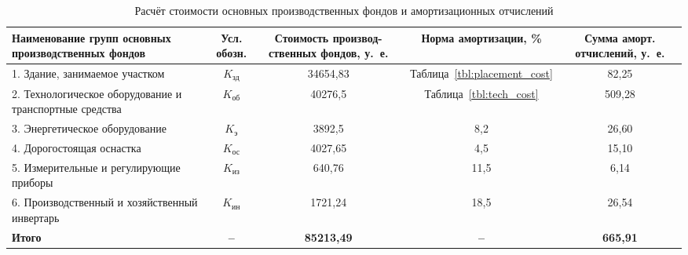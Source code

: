 \begin{table} [h!]
  \caption{
    Расчёт стоимости основных производственных фондов и
    амортизационных отчислений
  }\label{tbl:common_cost}
  {\small
    \begin{tabular}{| m{6.3cm} | c | c | c | c |}
      \hline
        \parbox{6.3cm}{
          \smallskip
          \centering Наименование групп основных производственных фондов
          \smallskip
        }
      & \parbox{1cm}{
          \smallskip
          \centering Усл. \\ обозн.
        }
      & \parbox{2.3cm}{
        \smallskip
          \centering Стоимость производ- ственных фондов, у.~е.
        }
      & \parbox{2.3cm}{
          \centering Норма амортизации, \%
        }
      & \parbox{2.4cm}{
          \centering Сумма аморт. отчислений, у.~е.
        } \\
      \hline

      1. Здание, занимаемое участком 
      & \( K_{\text{зд}} \) 
      & 34654{,}83 & Таблица~\ref{tbl:placement_cost} & 82{,}25 \\
      \hline

      2. Технологическое оборудование \newline и транспортные средства 
      & \( K_{\text{об}} \) 
      & 40276{,}5 & Таблица~\ref{tbl:tech_cost} & 509{,}28 \\
      \hline

      3. Энергетическое оборудование
      & \( K_{\text{э}} \) 
      & 3892{,}5 & 8{,}2 & 26{,}60 \\
      \hline

      4. Дорогостоящая оснастка
      & \( K_{\text{ос}} \) 
      & 4027{,}65 & 4{,}5 & 15{,}10 \\
      \hline

      5. Измерительные \newline и регулирующие приборы
      & \( K_{\text{из}} \) 
      & 640{,}76 & 11{,}5 & 6{,}14 \\
      \hline

      6. Производственный \newline и хозяйственный инвертарь
      & \( K_{\text{ин}} \) 
      & 1721{,}24 & 18{,}5 & 26{,}54 \\
      \hline

      \raggedleft \textbf{Итого} 
      & \textbf{--}
      & \textbf{85213{,}49} & \textbf{--} & \textbf{665{,}91} \\
      \hline
    \end{tabular}
  }
\end{table}
